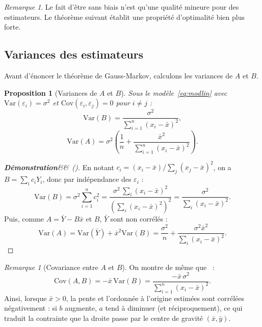 \documentclass[12pt,a4paper]{article}
\newtheorem{proposition}[theoreme]{Proposition}
\theoremstyle{definition}
\theoremstyle{remark}
\newtheorem{remarque}[theoreme]{Remarque}
\newenvironment{demonstration}[1][]
  {\begin{proof}[\textbf{Démonstration}\ifx&#1&\else\ (#1)\fi]}
  {\end{proof}}
\newcommand{\Var}{\mathrm{Var}}
\newcommand{\Cov}{\mathrm{Cov}}
\newcommand{\xbar}{\bar{x}}
\newcommand{\ybar}{\bar{y}}
\begin{document}
\begin{remarque}
Le fait d'être sans biais n'est qu'une qualité mineure pour des estimateurs.
Le théorème suivant établit une propriété d'optimalité bien plus forte.
\end{remarque}

\subsection{Variances des estimateurs}

Avant d'énoncer le théorème de Gauss-Markov, calculons les variances de $A$ et $B$.

\begin{proposition}[Variances de $A$ et $B$]
\label{prop:variances}
Sous le modèle~\eqref{eq:modlin} avec $\Var(\varepsilon_i) = \sigma^2$
et $\Cov(\varepsilon_i, \varepsilon_j) = 0$ pour $i \neq j$ :
\begin{equation}
  \label{eq:varB}
  \Var(B) = \frac{\sigma^2}{\displaystyle\sum_{i=1}^n (x_i - \xbar)^2},
\end{equation}
\begin{equation}
  \label{eq:varA}
  \Var(A) = \sigma^2\!\left(\frac{1}{n} + \frac{\xbar^2}{\displaystyle\sum_{i=1}^n (x_i - \xbar)^2}\right).
\end{equation}
\end{proposition}

\begin{demonstration}
En notant $c_i = (x_i - \xbar)/\sum_j (x_j - \xbar)^2$, on a $B = \sum_i c_i Y_i$,
donc par indépendance des $\varepsilon_i$ :
\[
  \Var(B) = \sigma^2 \sum_{i=1}^n c_i^2
          = \frac{\sigma^2\,\sum_i(x_i-\xbar)^2}{\left(\sum_i(x_i-\xbar)^2\right)^2}
          = \frac{\sigma^2}{\sum_i(x_i-\xbar)^2}.
\]
Puis, comme $A = \bar{Y} - B\xbar$ et $B$, $\bar{Y}$ sont non corrélés
:
\[
  \Var(A) = \Var(\bar{Y}) + \xbar^2\Var(B) = \frac{\sigma^2}{n} + \frac{\sigma^2\xbar^2}{\sum_i(x_i-\xbar)^2}.
\]
\end{demonstration}

\begin{remarque}[Covariance entre $A$ et $B$]
On montre de même que~\cite{poly2024} :
\[
  \Cov(A, B) = -\xbar\,\Var(B) = \frac{-\xbar\,\sigma^2}{\displaystyle\sum_{i=1}^n(x_i - \xbar)^2}.
\]
Ainsi, lorsque $\xbar > 0$, la pente et l'ordonnée à l'origine estimées sont
corrélées négativement : si $b$ augmente, $a$ tend à diminuer (et réciproquement),
ce qui traduit la contrainte que la droite passe par le centre de gravité $(\xbar, \ybar)$.
\end{remarque}
\end{document}
